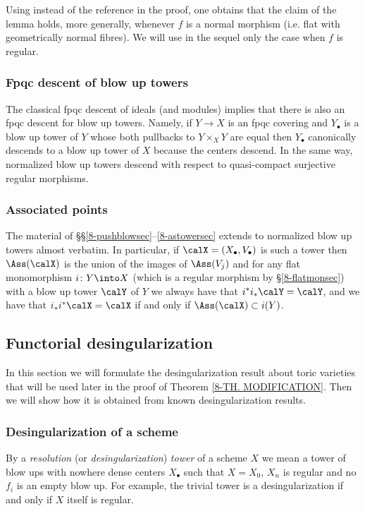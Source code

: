 \documentclass[10pt]{../fichiers-configuration-latex/smfart}
\begin{document}
\begin{remark2} Using  instead of the
reference in the proof, one obtains that the claim of the lemma
holds, more generally, whenever $f$ is a normal morphism (i.e. flat
with geometrically normal fibres). We will use in the sequel only
the case when $f$ is regular.  \end{remark2}

\subsubsection{Fpqc descent of blow up towers}\label{8-descsubsec}
The classical fpqc descent of ideals (and modules) implies that
there is also an fpqc descent for blow up towers. Namely, if $Y\to
X$ is an fpqc covering and $Y_\bullet$ is a blow up tower of $Y$
whose both pullbacks to $Y\times_XY$ are equal then $Y_\bullet$
canonically descends to a blow up tower of $X$ because the centers
descend. In the same way, normalized blow up towers descend with
respect to quasi-compact surjective regular morphisms.

\subsubsection{Associated points}\label{8-assnorsec} The
material of \S\S\ref{8-pushblowsec}--\ref{8-astowersec} extends
to normalized blow up towers almost verbatim. In particular,
if $\calX=(X_\bullet,V_\bullet)$ is such a tower then $\Ass(\calX)$
is the union of the images of $\Ass(V_j)$ and for any flat
monomorphism $i{\colon}Y\into X$ (which is a regular morphism by
\S\ref{8-flatmonsec}) with a blow up tower $\calY$ of $Y$ we always
have that $i^*i_*\calY=\calY$, and we have that $i_*i^*\calX=\calX$
if and only if $\Ass(\calX)\subset i(Y)$.

\subsection{Functorial desingularization}\label{8-desingsec} In
this section we will formulate the desingularization result about
toric varieties that will be used later in the proof of Theorem
\ref{8-TH. MODIFICATION}. Then we will show how it is obtained from
known desingularization results.

\subsubsection{Desingularization of a scheme}\label{8-desschsec}
By a {\em resolution} (or {\em desingularization}) {\em tower} of
a scheme $X$ we mean a tower of blow ups with nowhere dense centers
$X_{\bullet}$ such that $X=X_0$, $X_n$ is regular and no $f_i$ is an
empty blow up. For example, the trivial tower is a desingularization
if and only if $X$ itself is regular.
\end{document}
